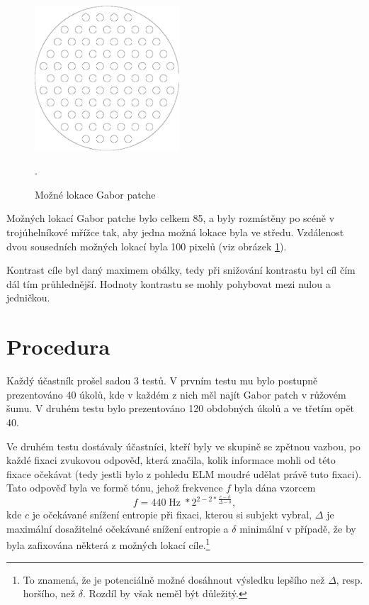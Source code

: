 \begin{figure}
\centering
\includegraphics[width=0.48\textwidth]{img/locations_outline.png}
\caption {Možné lokace Gabor patche}.
\label{LokaceGP}
\end{figure}

Možných lokací Gabor patche bylo celkem 85, a byly rozmístěny po scéně v
trojúhelníkové mřížce tak, aby jedna možná lokace byla ve středu. Vzdálenost
dvou sousedních možných lokací byla 100 pixelů (viz obrázek \ref{LokaceGP}). 

Kontrast cíle byl daný maximem obálky, tedy při snižování kontrastu byl cíl čím
dál tím průhlednější. Hodnoty kontrastu se mohly pohybovat mezi nulou a
jedničkou.

\section{Procedura}

Každý účastník prošel sadou 3 testů. V prvním testu mu bylo postupně
prezentováno 40 úkolů, kde v každém z nich měl najít Gabor patch v růžovém
šumu.  V druhém testu bylo prezentováno 120 obdobných úkolů a ve třetím opět
40. 

Ve druhém testu dostávaly účastníci, kteří byly ve skupině se zpětnou
vazbou, po každé fixaci zvukovou odpověď, která značila, kolik informace mohli
od této fixace očekávat (tedy jestli bylo z pohledu ELM moudré udělat právě
tuto fixaci). Tato odpověď byla ve formě tónu, jehož frekvence $f$ byla dána
vzorcem $$f = 440\operatorname{Hz}*2^{2-2*\frac{c - \delta}{\Delta -
\delta}},$$ kde $c$ je očekávané snížení entropie při fixaci, kterou si subjekt
vybral, $\Delta$ je maximální dosažitelné očekávané snížení entropie a $\delta$
minimální v případě, že by byla zafixována některá z možných lokací
cíle.\footnote{To znamená, že je potenciálně možné dosáhnout výsledku lepšího
než $\Delta$, resp. horšího, než $\delta$. Rozdíl by však neměl být důležitý.} 

